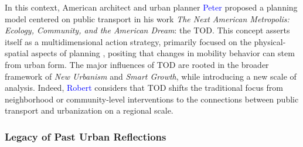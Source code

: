 \begin{refsegment}
In this context, American architect and urban planner \textcolor{blue}{Peter} \textcolor{blue}{\textcite[10]{calthorpe_next_1993}} proposed a planning model centered on public transport in his work \foreignlanguage{english}{\textsl{The Next American Metropolis: Ecology, Community, and the American Dream}}: the \acrfull{TOD}. This concept asserts itself as a multidimensional action strategy, primarily focused on the physical-spatial aspects of planning \textcolor{blue}{\autocite[10]{calthorpe_next_1993}}, positing that changes in mobility behavior can stem from urban form. The major influences of \acrshort{TOD} are rooted in the broader framework of \textsl{New Urbanism} and \textsl{Smart Growth}, while introducing a new scale of analysis. Indeed, \textcolor{blue}{Robert} \textcolor{blue}{\textcite[7]{cervero_transit_1998}} considers that \acrshort{TOD} shifts the traditional focus from neighborhood or community-level interventions to the connections between public transport and urbanization on a regional scale.%

\subsubsection*{Legacy of Past Urban Reflections
    \label{chap1:tod-presentation-generale-origines-mouvements}
    }


\end{refsegment}
